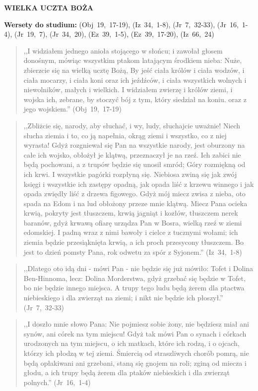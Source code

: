 \documentclass[10pt,a4paper,oneside]{article}
\begin{document}
\centerline{\textbf{\MakeUppercase{Wielka uczta Boża}}}
\begin{center}
\textbf{Wersety do studium:} (Obj~19,~17-19), (Iz~34,~1-8), (Jr~7,~32-33), (Jr~16,~1-4), (Jr~19,~7), (Jr~34,~20), (Ez~39,~1-5), (Ez~39,~17-20), (Iz~66,~24)
\end{center}
\begin{quote}
,,I widziałem jednego anioła stojącego w słońcu; i zawołał głosem donośnym, mówiąc wszystkim ptakom latającym środkiem nieba: Nuże, zbierzcie się na wielką ucztę Bożą, By jeść ciała królów i ciała wodzów, i ciała mocarzy, i ciała koni oraz ich jeźdźców, i ciała wszystkich wolnych i niewolników, małych i wielkich. I widziałem zwierzę i królów ziemi, i wojska ich, zebrane, by stoczyć bój z tym, który siedział na koniu. oraz z jego wojskiem.'' (Obj~19,~17-19)
\end{quote}
\begin{quote}
,,Zbliżcie się, narody, aby słuchać, i wy, ludy, słuchajcie uważnie! Niech słucha ziemia i to, co ją napełnia, okrąg ziemi i wszystko, co z niej wyrasta! Gdyż rozgniewał się Pan na wszystkie narody, jest oburzony na całe ich wojsko, obłożył je klątwą, przeznaczył je na rzeź. Ich zabici nie będą pochowani, a z trupów będzie się unosił smród; Góry rozmiękną od ich krwi. I wszystkie pagórki rozpłyną się. Niebiosa zwiną się jak zwój księgi i wszystkie ich zastępy opadną, jak opada liść z krzewu winnego i jak opada zwiędły liść z drzewa figowego. Gdyż mój miecz zwisa z nieba, oto spada na Edom i na lud obłożony przeze mnie klątwą. Miecz Pana ocieka krwią, pokryty jest tłuszczem, krwią jagniąt i kozłów, tłuszczem nerek baranów, gdyż krwawą ofiarę urządza Pan w Bosra, wielką rzeź w ziemi edomskiej. I padną wraz z nimi bawoły i cielce z tucznymi wołami; ich ziemia będzie przesiąknięta krwią, a ich proch przesycony tłuszczem. Bo jest to dzień pomsty Pana, rok odwetu za spór z Syjonem.'' (Iz~34,~1-8)
\end{quote}
\begin{quote}
,,Dlatego oto idą dni - mówi Pan - nie będzie się już mówiło: Tofet i Dolina Ben-Hinnoma, lecz: Dolina Morderstwa, gdyż grzebać się będzie w Tofet, bo nie będzie innego miejsca. A trupy tego ludu będą żerem dla ptactwa niebieskiego i dla zwierząt na ziemi; i nikt nie będzie ich płoszył.'' (Jr~7,~32-33)
\end{quote}
\begin{quote}
,,I doszło mnie słowo Pana: Nie pojmiesz sobie żony, nie będziesz miał ani synów, ani córek na tym miejscu! Gdyż tak mówi Pan o synach i córkach urodzonych na tym miejscu, o ich matkach, które ich rodzą, i o ojcach, którzy ich płodzą w tej ziemi. Śmiercią od straszliwych chorób pomrą, nie będą opłakiwani ani grzebani, staną się gnojem na roli; zginą od miecza i głodu, a ich trupy będą żerem dla ptaków niebieskich i dla zwierząt polnych.'' (Jr~16,~1-4)
\end{quote}
\end{document}
